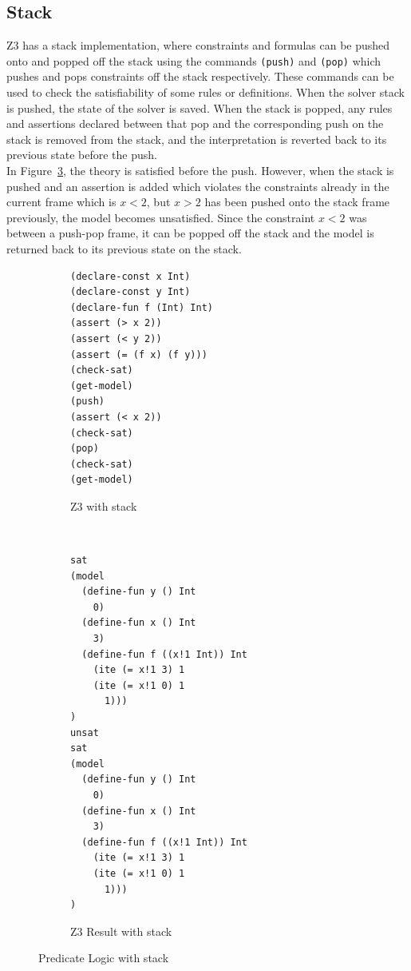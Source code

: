 \documentclass[a4paper]{report}
\begin{document}
\subsection{Stack}
Z3 has a stack implementation, where constraints and formulas can be pushed onto and popped off the stack using the commands \texttt{(push)} and \texttt{(pop)} which pushes and pops constraints off the stack respectively. These commands can be used to check the satisfiability of some rules or definitions. When the solver stack is pushed, the state of the solver is saved. When the stack is popped, any rules and assertions declared between that pop and the corresponding push on the stack is removed from the stack, and the interpretation is reverted back to its previous state before the push.\\
In Figure~\ref{fig:Predicate Logic with stack}, the theory is satisfied before the push. However, when the stack is pushed and an assertion is added which violates the constraints already in the current frame which is $x < 2$, but $x > 2$ has been pushed onto the stack frame previously, the model becomes unsatisfied. Since the constraint $x < 2$ was between a push-pop frame, it can be popped off the stack and the model is returned back to its previous state on the stack.\\
\begin{figure}[!htb]
\centering
\begin{subfigure}[b]{\textwidth}
\lstset{numbers=left, showspaces=false,
    showstringspaces=false, tabsize=2, breaklines=true,
    xleftmargin=5.0ex,
}
\centering
\begin{lstlisting}[frame=single]
(declare-const x Int)
(declare-const y Int)
(declare-fun f (Int) Int)
(assert (> x 2))
(assert (< y 2))
(assert (= (f x) (f y)))
(check-sat)
(get-model)
(push)
(assert (< x 2))
(check-sat)
(pop)
(check-sat)
(get-model)
\end{lstlisting}
\caption{Z3 with stack}
\label{fig:Z3 with stack}
\end{subfigure}\\
\begin{subfigure}[b]{\textwidth}
\begin{lstlisting}[frame=single]
sat
(model 
  (define-fun y () Int
    0)
  (define-fun x () Int
    3)
  (define-fun f ((x!1 Int)) Int
    (ite (= x!1 3) 1
    (ite (= x!1 0) 1
      1)))
)
unsat
sat
(model 
  (define-fun y () Int
    0)
  (define-fun x () Int
    3)
  (define-fun f ((x!1 Int)) Int
    (ite (= x!1 3) 1
    (ite (= x!1 0) 1
      1)))
)
\end{lstlisting}
\caption{Z3 Result with stack}
\label{fig:Z3 Function stack}
\end{subfigure}
\caption{Predicate Logic with stack}
\label{fig:Predicate Logic with stack}
\end{figure} 
\end{document}
